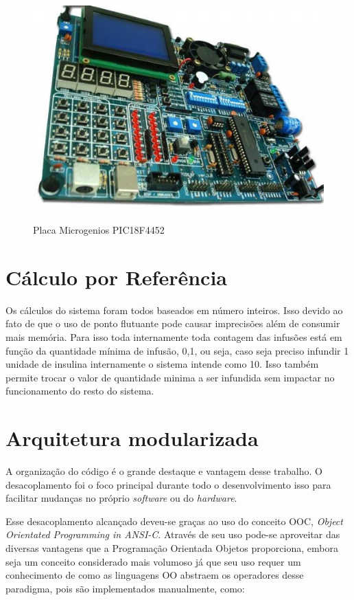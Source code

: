  \newpage
 
 \begin{figure}[htp]
 	\centering
 	\includegraphics[scale=1]{images/pic_microgenio.png}
 	\caption{Placa Microgenios PIC18F4452}	
 	\label{fig:microgenios}
 	\cite{eletronicabrasil}
 \end{figure}
 
\section{Cálculo por Referência}

Os cálculos do sistema foram todos baseados em número inteiros. Isso devido ao fato de que o uso de ponto flutuante pode causar imprecisões além de consumir mais memória. Para isso toda internamente toda contagem das infusões está em função da quantidade mínima de infusão, 0,1, ou seja, caso seja preciso infundir 1 unidade de insulina internamente o sistema intende como 10. Isso também permite trocar o valor de quantidade minima a ser infundida sem impactar no funcionamento do resto do sistema.

\section{Arquitetura modularizada}

A organização do código é o grande destaque e vantagem desse trabalho. O desacoplamento foi o foco principal durante todo o desenvolvimento isso para facilitar mudanças no próprio \emph{software} ou do \emph{hardware}. 

Esse desacoplamento alcançado deveu-se graças ao uso do conceito OOC, \emph{Object Orientated Programming in ANSI-C}. Através de seu uso pode-se aproveitar das diversas vantagens que a Programação Orientada Objetos proporciona, embora seja um conceito considerado mais volumoso já que seu uso requer um conhecimento de como as linguagens OO abstraem os operadores desse paradigma, pois são implementados manualmente, como:

